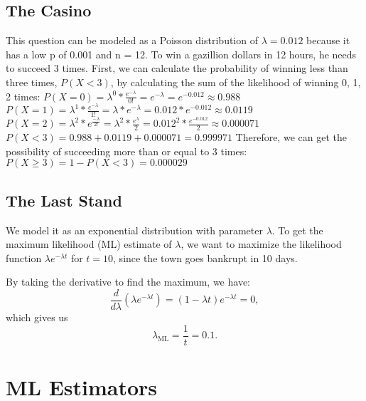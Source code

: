 \documentclass{exam}
\begin{document}
\subsection{The Casino}
This question can be modeled as a Poisson distribution of $\lambda = 0.012$ because it has a low p of 0.001 and n = 12. To win a gazillion dollars in 12 hours, he needs to succeed 3 times. First, we can calculate the probability of winning less than three times, $P(X<3)$, by calculating the sum of the likelihood of winning 0, 1, 2 times: \newline \newline
$P(X=0) = \lambda^0*\frac{e^{-\lambda}}{0!}=e^{-\lambda}=e^{-0.012}\approx0.988$ \newline
$P(X=1) = \lambda^1*\frac{e^{-\lambda}}{1!}=\lambda*e^{-\lambda}=0.012*e^{-0.012}\approx0.0119$ \newline
$P(X=2) = \lambda^2*e^\frac{{-\lambda}}{2!}=\lambda^2*\frac{e^\lambda}{2}=0.012^2*\frac{e^{-0.012}}{2}\approx0.000071$ \newline
$P(X<3) = 0.988+0.0119+0.000071 = 0.999971$ \newline \newline
Therefore, we can get the possibility of succeeding more than or equal to 3 times:
\newline
$P(X \ge 3) = 1 - P(X<3) = 0.000029$

\subsection{The Last Stand}
We model it as an exponential distribution with parameter \(\lambda\). To get the maximum likelihood (ML) estimate of \(\lambda\), we want to maximize the likelihood function \(\lambda e^{-\lambda t}\) for \(t = 10\), since the town goes bankrupt in 10 days. 

By taking the derivative to find the maximum, we have:
\[
\frac{d}{d\lambda} \left( \lambda e^{-\lambda t} \right) = (1 - \lambda t) e^{-\lambda t} = 0,
\]
which gives us 
\[
\lambda_{\text{ML}} = \frac{1}{t} = 0.1.
\]





\section{ML Estimators}
\end{document}
